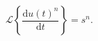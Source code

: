 \begin{equation}
    \mathscr{L} \left\{ \frac {\mathrm{d} u(t)^n} {\mathrm{d} t }\right\} = s^n.
\end{equation}
